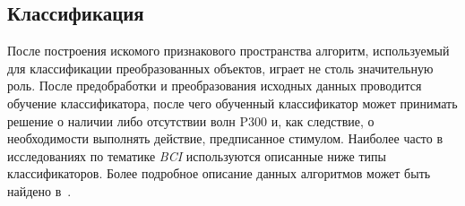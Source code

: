 \documentclass[12pt,a4paper,oneside,fleqn,leqno]{article}
\begin{document}
	\subsection{Классификация}
	\par После построения искомого признакового пространства алгоритм, используемый для классификации преобразованных объектов, играет не столь значительную роль. После предобработки и преобразования исходных данных проводится обучение классификатора, после чего обученный классификатор может принимать решение о наличии либо отсутствии волн P300 и, как следствие, о необходимости выполнять действие, предписанное стимулом. Наиболее часто в исследованиях по тематике {\it BCI} используются описанные ниже типы классификаторов. Более подробное описание данных алгоритмов может быть найдено в~\cite{Vorontsov}.
\end{document}
